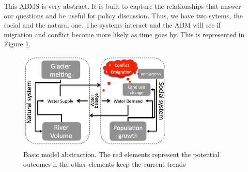 \documentclass[doc,12pt,floatsintext]{apa7}
\begin{document}
% 

This ABMS is very abstract.  It is built to capture the  relationships that answer our questions and be useful for policy discussion. Thus, we have two sytems, the social and the natural one. The systems interact and the ABM will see if  migration and conflict become more likely as time goes by. This is represented in Figure \ref{scheme}.

\begin{figure}[ht]
  \centering
  \includegraphics[width=0.7\textwidth]{modelsummaryGraph}
  \caption[Basic model abstraction]{Basic model abstraction. The red elements represent the potential outcomes if the other elements keep the current trends}
  \label{scheme}
\end{figure}
\end{document}
